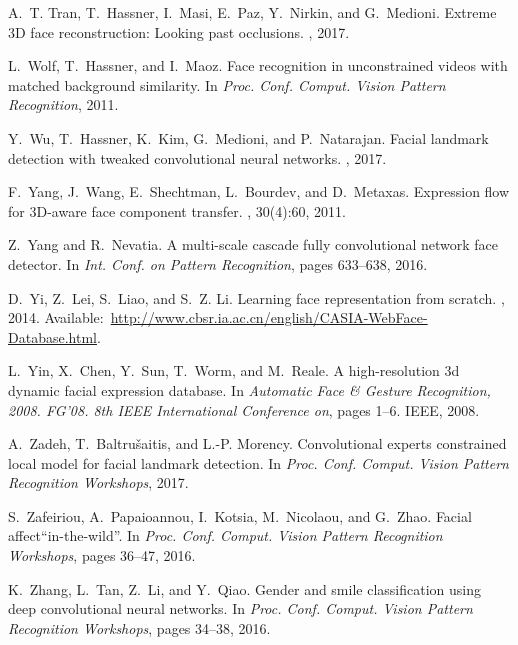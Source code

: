 \documentclass[a4paper, 10pt, conference]{ieeeconf}
\begin{document}
\begin{thebibliography}{10}
A.~T. Tran, T.~Hassner, I.~Masi, E.~Paz, Y.~Nirkin, and G.~Medioni.
\newblock Extreme {3D} face reconstruction: Looking past occlusions.
, 2017.

L.~Wolf, T.~Hassner, and I.~Maoz.
\newblock Face recognition in unconstrained videos with matched background
  similarity.
\newblock In {\em Proc. Conf. Comput. Vision Pattern Recognition}, 2011.

Y.~Wu, T.~Hassner, K.~Kim, G.~Medioni, and P.~Natarajan.
\newblock Facial landmark detection with tweaked convolutional neural networks.
,
  2017.

F.~Yang, J.~Wang, E.~Shechtman, L.~Bourdev, and D.~Metaxas.
\newblock Expression flow for {3D}-aware face component transfer.
, 30(4):60, 2011.

Z.~Yang and R.~Nevatia.
\newblock A multi-scale cascade fully convolutional network face detector.
\newblock In {\em Int. Conf. on Pattern Recognition}, pages 633--638, 2016.

D.~Yi, Z.~Lei, S.~Liao, and S.~Z. Li.
\newblock Learning face representation from scratch.
, 2014.
\newblock
  Available:~\url{http://www.cbsr.ia.ac.cn/english/CASIA-WebFace-Database.html}.

L.~Yin, X.~Chen, Y.~Sun, T.~Worm, and M.~Reale.
\newblock A high-resolution 3d dynamic facial expression database.
\newblock In {\em Automatic Face \& Gesture Recognition, 2008. FG'08. 8th IEEE
  International Conference on}, pages 1--6. IEEE, 2008.

A.~Zadeh, T.~Baltru{\v{s}}aitis, and L.-P. Morency.
\newblock Convolutional experts constrained local model for facial landmark
  detection.
\newblock In {\em Proc. Conf. Comput. Vision Pattern Recognition Workshops},
  2017.

S.~Zafeiriou, A.~Papaioannou, I.~Kotsia, M.~Nicolaou, and G.~Zhao.
\newblock Facial affect``in-the-wild''.
\newblock In {\em Proc. Conf. Comput. Vision Pattern Recognition Workshops},
  pages 36--47, 2016.

K.~Zhang, L.~Tan, Z.~Li, and Y.~Qiao.
\newblock Gender and smile classification using deep convolutional neural
  networks.
\newblock In {\em Proc. Conf. Comput. Vision Pattern Recognition Workshops},
  pages 34--38, 2016.


\end{thebibliography}
\end{document}
